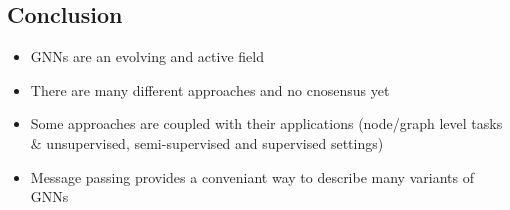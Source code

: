 \subsection{Conclusion}
\begin{itemize}
    \item GNNs are an evolving and active field
    \item There are many different approaches and no cnosensus yet
    \item Some approaches are coupled with their applications (node/graph level tasks \& unsupervised, semi-supervised and supervised settings)
    \item Message passing provides a conveniant way to describe many variants of GNNs
\end{itemize}